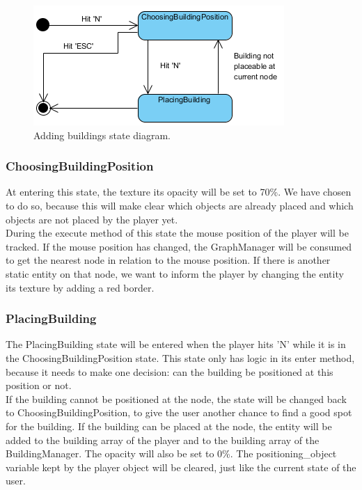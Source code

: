 \begin{figure}[!htb]
    \centering
    \includegraphics{res/adding-buildings/States-StateDiagram.png}
    \caption{Adding buildings state diagram.}\label{fig:statediagram-addingbuildings}
\end{figure}

\subsubsection{ChoosingBuildingPosition}
At entering this state, the texture its opacity will be set to 70\%. We have chosen to do so, because this will make clear which objects are already placed and which objects are not placed by the player yet.\\
During the execute method of this state the mouse position of the player will be tracked. If the mouse position has changed, the GraphManager will be consumed to get the nearest node in relation to the mouse position. If there is another static entity on that node, we want to inform the player by changing the entity its texture by adding a red border.

\subsubsection{PlacingBuilding}
The PlacingBuilding state will be entered when the player hits 'N' while it is in the ChoosingBuildingPosition state. This state only has logic in its enter method, because it needs to make one decision: can the building be positioned at this position or not.\\
If the building cannot be positioned at the node, the state will be changed back to ChoosingBuildingPosition, to give the user another chance to find a good spot for the building. If the building can be placed at the node, the entity will be added to the building array of the player and to the building array of the BuildingManager. The opacity will also be set to 0\%. The positioning\_object variable kept by the player object will be cleared, just like the current state of the user.

